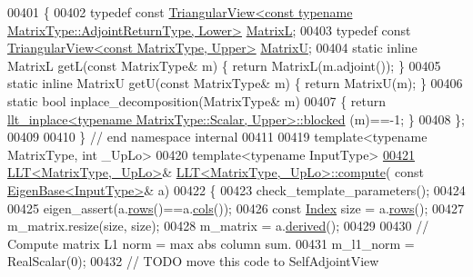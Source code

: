 \begin{DoxyCode}
00401 \{
00402   \textcolor{keyword}{typedef} \textcolor{keyword}{const} 
      \hyperlink{group___core___module_class_eigen_1_1_triangular_view}{TriangularView<const typename MatrixType::AdjointReturnType, Lower>}
       \hyperlink{group___core___module_class_eigen_1_1_triangular_view}{MatrixL};
00403   \textcolor{keyword}{typedef} \textcolor{keyword}{const} \hyperlink{group___core___module_class_eigen_1_1_triangular_view}{TriangularView<const MatrixType, Upper>} 
      \hyperlink{group___core___module_class_eigen_1_1_triangular_view}{MatrixU};
00404   \textcolor{keyword}{static} \textcolor{keyword}{inline} MatrixL getL(\textcolor{keyword}{const} MatrixType& m) \{ \textcolor{keywordflow}{return} MatrixL(m.adjoint()); \}
00405   \textcolor{keyword}{static} \textcolor{keyword}{inline} MatrixU getU(\textcolor{keyword}{const} MatrixType& m) \{ \textcolor{keywordflow}{return} MatrixU(m); \}
00406   \textcolor{keyword}{static} \textcolor{keywordtype}{bool} inplace\_decomposition(MatrixType& m)
00407   \{ \textcolor{keywordflow}{return} \hyperlink{struct_eigen_1_1internal_1_1llt__inplace}{llt\_inplace<typename MatrixType::Scalar, Upper>::blocked}
      (m)==-1; \}
00408 \};
00409 
00410 \} \textcolor{comment}{// end namespace internal}
00411 
00419 \textcolor{keyword}{template}<\textcolor{keyword}{typename} MatrixType, \textcolor{keywordtype}{int} \_UpLo>
00420 \textcolor{keyword}{template}<\textcolor{keyword}{typename} InputType>
\hyperlink{group___cholesky___module_a2cd165423fe8e1d71066c97bcb488fab}{00421} \hyperlink{group___cholesky___module_class_eigen_1_1_l_l_t}{LLT<MatrixType,\_UpLo>}& \hyperlink{group___cholesky___module_class_eigen_1_1_l_l_t}{LLT<MatrixType,\_UpLo>::compute}(\textcolor{keyword}{
      const} \hyperlink{group___core___module_struct_eigen_1_1_eigen_base}{EigenBase<InputType>}& a)
00422 \{
00423   check\_template\_parameters();
00424 
00425   eigen\_assert(a.\hyperlink{group___core___module_a8141320ba8df384426c298b32b000d8e}{rows}()==a.\hyperlink{group___core___module_a7b0b45c7351847696c911ce8aa2abbdb}{cols}());
00426   \textcolor{keyword}{const} \hyperlink{group___cholesky___module_ac7a64274814fa76e8b1e9e945546037f}{Index} size = a.\hyperlink{group___core___module_a8141320ba8df384426c298b32b000d8e}{rows}();
00427   m\_matrix.resize(size, size);
00428   m\_matrix = a.\hyperlink{group___core___module_a324b16961a11d2ecfd2d1b7dd7946545}{derived}();
00429 
00430   \textcolor{comment}{// Compute matrix L1 norm = max abs column sum.}
00431   m\_l1\_norm = RealScalar(0);
00432   \textcolor{comment}{// TODO move this code to SelfAdjointView}

\end{DoxyCode}
